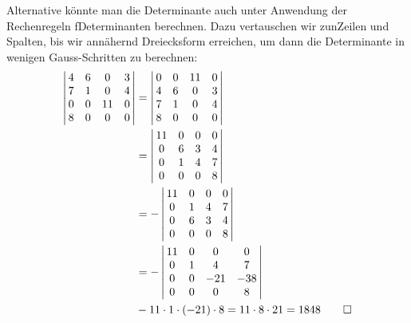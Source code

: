 \begin{loesung}
Alternative könnte man die Determinante auch unter Anwendung der
Rechenregeln f Determinanten berechnen. Dazu vertauschen wir
zun Zeilen und Spalten, bis wir annähernd Dreiecksform erreichen,
um dann die Determinante in wenigen Gauss-Schritten zu berechnen:
\begin{align*}
\left|\,\begin{matrix}
4&6& 0&3\\
7&1& 0&4\\
0&0&11&0\\
8&0& 0&0
\end{matrix}\,\right|
&=
\left|\,\begin{matrix}
0&0&11&0\\
4&6& 0&3\\
7&1& 0&4\\
8&0& 0&0
\end{matrix}\,\right|
\\
&=
\left|\,\begin{matrix}
11&0&0&0\\
 0&6&3&4\\
 0&1&4&7\\
 0&0&0&8
\end{matrix}\,\right|\\
&=
-\left|\,\begin{matrix}
11&0&0&0\\
 0&1&4&7\\
 0&6&3&4\\
 0&0&0&8
\end{matrix}\,\right|\\
&=
-\left|\,\begin{matrix}
11&0&  0&  0\\
 0&1&  4&  7\\
 0&0&-21&-38\\
 0&0&  0&  8
\end{matrix}\,\right|\\
&-11\cdot 1\cdot (-21)\cdot 8=11\cdot 8\cdot 21=1848
\qedhere
\end{align*}
\end{loesung}

